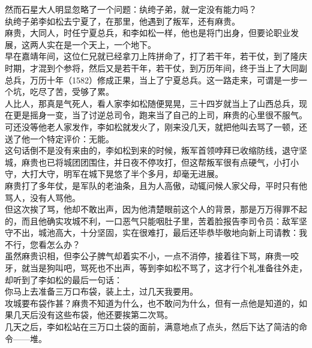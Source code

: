 \begin{multicols}{\theparacolNo}
然而石星大人明显忽略了一个问题：纨绔子弟，就一定没有能力吗？\\

纨绔子弟李如松去宁夏了，在那里，他遇到了叛军，还有麻贵。\\

麻贵，大同人，时任宁夏总兵，和李如松一样，他也是将门出身，但要论职业发展，这两人实在是一个天上，一个地下。\\

早在嘉靖年间，这位仁兄就已经拿刀上阵拼命了，打了若干年，若干仗，到了隆庆时期，才混到个参将，然后又是若干年，若干仗，到万历年间，终于当上了大同副总兵，万历十年（1582）修成正果，当上了宁夏总兵。这一路走来，可谓是一步一个坑，吃尽了苦，受够了累。\\

人比人，那真是气死人，看人家李如松随便晃晃，三十四岁就当上了山西总兵，现在更是摇身一变，当了讨逆总司令，跑来当了自己的上司，麻贵的心里很不服气。\\

可还没等他老人家发作，李如松就发火了，刚来没几天，就把他叫去骂了一顿，还送了他一个特定评价：无能。\\

这句话倒不是没有来由的，李如松到来的时候，叛军首领哱拜已收缩防线，退守坚城，麻贵也已将城团团围住，并日夜不停攻打，但这帮叛军很有点硬气，小打小守，大打大守，明军在城下晃悠了半个多月，却毫无进展。\\

麻贵打了多年仗，是军队的老油条，且为人高傲，动辄问候人家父母，平时只有他骂人，没有人骂他。\\

但这次挨了骂，他却不敢出声，因为他清楚眼前这个人的背景，那是万万得罪不起的，而且他确实攻城不利，一口恶气只能咽肚子里，苦着脸报告李司令员：敌军坚守不出，城池高大，十分坚固，实在很难打，最后还毕恭毕敬地向新上司请教：我不行，您看怎么办？\\

虽然麻贵识相，但李公子脾气却着实不小，一点不消停，接着往下骂，麻贵一咬牙，就当是狗叫吧，骂死也不出声，等到李如松不骂了，这才行个礼准备往外走，却听到了李如松的最后一句话：\\

你马上去准备三万口布袋，装上土，过几天我要用。\\

攻城要布袋作甚？麻贵不知道为什么，也不敢问为什么，但有一点他是知道的，如果几天后没有这些布袋，他还要挨第二次骂。\\

几天之后，李如松站在三万口土袋的面前，满意地点了点头，然后下达了简洁的命令——堆。\\


\end{multicols}
